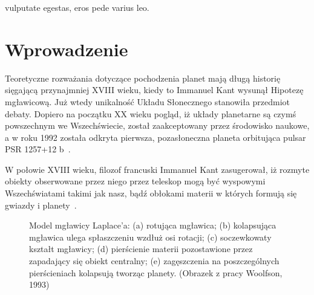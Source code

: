 \begin{savequote}[75mm]
vulputate egestas, eros pede varius leo.  
\end{savequote}

\chapter{Wprowadzenie}
Teoretyczne rozważania dotyczące pochodzenia planet mają długą historię
sięgającą przynajmniej XVIII wieku, kiedy to Immanuel Kant wysunął \dq{}Hipotezę
mgławicową\dq{}. Już wtedy unikalność Układu Słonecznego stanowiła przedmiot
debaty. Dopiero na początku XX wieku pogląd, iż układy planetarne są czymś
powszechnym we Wszechświecie, został zaakceptowany przez środowisko naukowe, a w
roku 1992 została odkryta pierwsza, pozasłoneczna planeta orbitująca pulsar PSR
1257+12 b~\cite{1992Natur.355..145W}.

W połowie XVIII wieku, filozof francuski Immanuel Kant zasugerował, iż rozmyte
o\-biek\-ty obserwowane przez niego przez teleskop mogą być wyspowymi
Wszechświatami takimi jak nasz, bądź obłokami materii w których formują się
gwiazdy i planety~\cite{ImmanuelKant.etal:2008}.

\begin{figure}[!ht]
\centering
\caption{Model mgławicy Laplace'a: (a) rotująca mgławica; (b) kolapsująca
mgławica ulega spłaszczeniu wzdłuż osi rotacji; (c) soczewkowaty kształt
mgławicy; (d) pierścienie materii pozostawione przez zapadający się obiekt
centralny; (e) zagęszczenia na poszczególnych pierścieniach kolapsują tworząc
planety. (Obrazek z pracy Woolfson, 1993)} 
\label{fig:laplace}
\end{figure}

